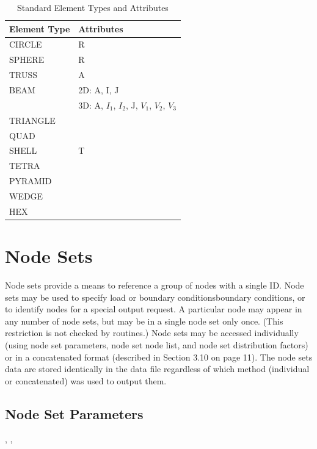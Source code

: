 \begin{table}[htbp]
\begin{center}
\begin{tabular}{|l|l|} \hline
Element Type & Attributes \\ \hline
CIRCLE   & R \\ \hline
SPHERE   & R \\ \hline
TRUSS    & A \\ \hline
BEAM     & 2D: A, I, J \\
         & 3D: A, $I_1$, $I_2$, J, $V_1$, $V_2$, $V_3$ \\ \hline
TRIANGLE & \\ \hline
QUAD     & \\ \hline
SHELL    & T \\ \hline
TETRA    & \\ \hline
PYRAMID  & \\ \hline
WEDGE    & \\ \hline
HEX      & \\ \hline
\end{tabular}
\caption{Standard Element Types and Attributes}\label{t:element_types}
\end{center}
\end{table}

\section{Node Sets}

Node sets provide a means to reference a group of nodes with a single
ID. Node sets may be used to specify load or boundary
conditionsboundary conditions, or to identify nodes for a special
output request. A particular node may appear in any number of node
sets, but may be in a single node set only once. (This restriction is
not checked by \exo{} routines.) Node sets may be accessed
individually (using node set parameters, node set node list, and node
set distribution factors) or in a concatenated format (described in
Section 3.10 on page 11). The node sets data are stored identically in
the data file regardless of which method (individual or concatenated)
was used to output them.

\subsection{Node Set Parameters}

\begin{spacing}{1.5}
\api {}, , 
\end{spacing}

